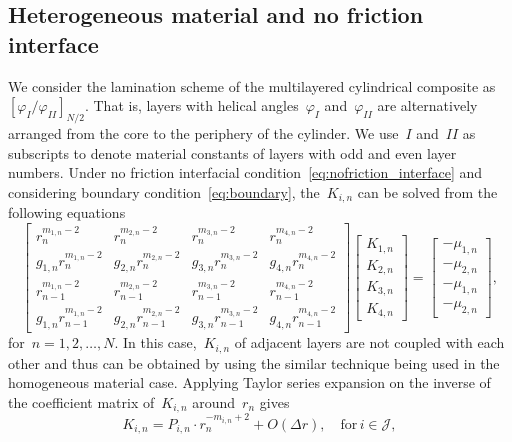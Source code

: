 \documentclass[preprint,10pt,times]{elsarticle}
\numberwithin{equation}{section}
\renewcommand{\>}{$\Rightarrow$}
\begin{document}
\subsection{Heterogeneous material and no friction interface}
\label{sec:2mat_no_friction}
We consider the lamination scheme of the multilayered cylindrical composite as~$[\varphi_{I}/\varphi_{II}]_{N/2}$. That is, layers with helical angles~$\varphi_I$ and~$\varphi_{II}$ are alternatively arranged from the core to the periphery of the cylinder. We use~$I$ and~$II$ as subscripts to denote material constants of layers with odd and even layer numbers.
Under no friction interfacial condition~\eqref{eq:nofriction_interface} and considering boundary condition~\eqref{eq:boundary}, the~$K_{i,n}$ can be solved from the following equations
\begin{equation}
	\begin{bmatrix}
		r_n^{m_{1,n} - 2} & r_n^{m_{2,n} - 2} & r_n^{m_{3,n} - 2} & r_n^{m_{4,n} - 2} \\
		g_{1,n} r_n^{m_{1,n} - 2} & g_{2,n} r_n^{m_{2,n} - 2} & g_{3,n} r_n^{m_{3,n} - 2} & g_{4,n} r_n^{m_{4,n} - 2} \\
		r_{n-1}^{m_{1,n} - 2} & r_{n-1}^{m_{2,n} - 2} & r_{n-1}^{m_{3,n} - 2} & r_{n-1}^{m_{4,n} - 2} \\
		g_{1,n} r_{n-1}^{m_{1,n} - 2} & g_{2,n} r_{n-1}^{m_{2,n} - 2} & g_{3,n} r_{n-1}^{m_{3,n} - 2} & g_{4,n} r_{n-1}^{m_{4,n} - 2}
	\end{bmatrix}
	\begin{bmatrix}
		K_{1,n} \\ K_{2,n} \\ K_{3,n} \\ K_{4,n}
	\end{bmatrix}
	=
	\begin{bmatrix}
		-\mu_{1,n} \\ -\mu_{2,n} \\ -\mu_{1,n} \\ -\mu_{2,n}
	\end{bmatrix},
	\label{eq:eqs of Kin_two_mat_no_friction}
\end{equation}
for~$n = 1,2,\dots,N$. In this case,~$K_{i,n}$ of adjacent layers are not coupled with each other and thus can be obtained by using the similar technique being used in the homogeneous material case. Applying Taylor series expansion on the inverse of the coefficient matrix of~$K_{i,n}$ around~$r_n$ gives
\begin{equation}
	K_{i,n} = P_{i,n} \cdot r_n^{-m_{i,n} + 2} + O(\Delta r), \quad \text{for}\, i \in \mathcal{J},
	\label{eq:two_mat_no_friction_Ks}
\end{equation}
\end{document}

